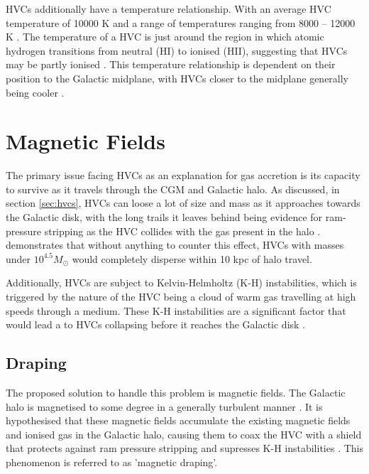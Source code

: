 HVCs additionally have a temperature relationship. With an average HVC temperature of 10000 K and a range of temperatures ranging from 8000 – 12000 K \citep{ID49, ID48}. The temperature of a HVC is just around the region in which atomic hydrogen transitions from neutral (HI) to ionised (HII), suggesting that HVCs may be partly ionised \citep{ID49, ID48, ID68}. This temperature relationship is dependent on their position to the Galactic midplane, with HVCs closer to the midplane generally being cooler \citep{ID48}.

\section{Magnetic Fields}
\label{sec:bfields}

The primary issue facing HVCs as an explanation for gas accretion is its capacity to survive as it travels through the CGM and Galactic halo. As discussed, in section \ref{sec:hvcs}, HVCs can loose a lot of size and mass as it approaches towards the Galactic disk, with the long trails it leaves behind being evidence for ram-pressure stripping as the HVC collides with the gas present in the halo \citep{ID11, ID23, ID33}. \cite{ID25} demonstrates that without anything to counter this effect, HVCs with masses under $10^{4.5} M_{\odot}$ would completely disperse within 10 kpc of halo travel.


Additionally, HVCs are subject to Kelvin-Helmholtz (K-H) instabilities, which is triggered by the nature of the HVC being a cloud of warm gas travelling at high speeds through a medium. These K-H instabilities are a significant factor that would lead a to HVCs collapsing before it reaches the Galactic disk \citep{ID11, ID23, ID33}.


\subsection{Draping}
\label{ssec:draping}

The proposed solution to handle this problem is magnetic fields. The Galactic halo is magnetised to some degree in a generally turbulent manner \citep{ID30}. It is hypothesised that these magnetic fields accumulate the existing magnetic fields and ionised gas in the Galactic halo, causing them to coax the HVC with a shield that protects against ram pressure stripping and supresses K-H instabilities \citep{ID10, ID11, ID13, ID23, ID24, ID34}. This phenomenon is referred to as 'magnetic draping'.


